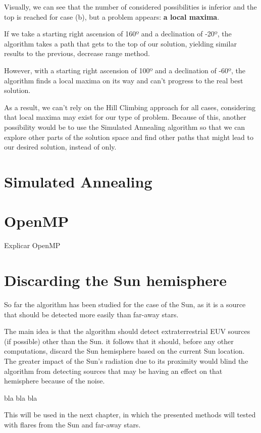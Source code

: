 Visually, we can see that the number of considered possibilities is inferior and the top is reached for case (b), but a problem appears: \textbf{a local maxima}.

If we take a starting right ascension of 160º and a declination of -20º, the algorithm takes a path that gets to the top of our solution, yielding similar results to the previous, decrease range method.

However, with a starting right ascension of 100º and a declination of -60º, the algorithm finds a local maxima on its way and can't progress to the real best solution.

As a result, we can't rely on the Hill Climbing approach for all cases, considering that local maxima may exist for our type of problem. Because of this, another possibility would be to use the Simulated Annealing algorithm so that we can explore other parts of the solution space and find other paths that might lead to our desired solution, instead of only.

\section{Simulated Annealing}

\section{OpenMP}

Explicar OpenMP

\section{Discarding the Sun hemisphere}

So far the algorithm has been studied for the case of the Sun, as it is a source that should be detected more easily than far-away stars. 

The main idea is that the algorithm should detect extraterrestrial EUV sources (if possible) other than the Sun. it follows that it should, before any other computations, discard the Sun hemisphere based on the current Sun location. The greater impact of the Sun's radiation due to its proximity would blind the algorithm from detecting sources that may be having an effect on that hemisphere because of the noise.


bla bla bla

This will be used in the next chapter, in which the presented methods will tested with flares from the Sun and far-away stars.